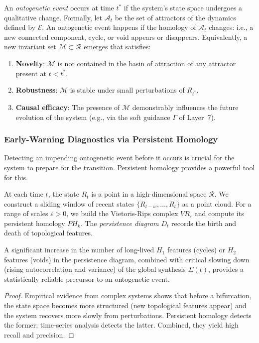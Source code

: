 \begin{definition}
An \emph{ontogenetic event} occurs at time $t^*$ if the system's state space undergoes a qualitative change. Formally, let $\mathcal{A}_t$ be the set of attractors of the dynamics defined by $\mathcal{E}$. An ontogenetic event happens if the homology of $\mathcal{A}_t$ changes: i.e., a new connected component, cycle, or void appears or disappears. Equivalently, a new invariant set $\mathcal{M} \subset \mathcal{R}$ emerges that satisfies:
\begin{enumerate}
    \item \textbf{Novelty}: $\mathcal{M}$ is not contained in the basin of attraction of any attractor present at $t < t^*$.
    \item \textbf{Robustness}: $\mathcal{M}$ is stable under small perturbations of $R_{t^*}$.
    \item \textbf{Causal efficacy}: The presence of $\mathcal{M}$ demonstrably influences the future evolution of the system (e.g., via the soft guidance $\Gamma$ of Layer~7).
\end{enumerate}
\end{definition}

\subsubsection{Early-Warning Diagnostics via Persistent Homology}
Detecting an impending ontogenetic event before it occurs is crucial for the system to prepare for the transition. Persistent homology \cite{edelsbrunner2010} provides a powerful tool for this.

\begin{definition}
At each time $t$, the state $R_t$ is a point in a high-dimensional space $\mathcal{R}$. We construct a sliding window of recent states $\{R_{t-w}, \dots, R_t\}$ as a point cloud. For a range of scales $\varepsilon > 0$, we build the Vietoris-Rips complex $VR_\varepsilon$ and compute its persistent homology $PH_k$. The \emph{persistence diagram} $D_t$ records the birth and death of topological features.
\end{definition}

\begin{theorem}
\label{thm:early_warning}
A significant increase in the number of long-lived $H_1$ features (cycles) or $H_2$ features (voids) in the persistence diagram, combined with critical slowing down (rising autocorrelation and variance) of the global synthesis $\Sigma(t)$, provides a statistically reliable precursor to an ontogenetic event.
\end{theorem}
\begin{proof}
Empirical evidence from complex systems shows that before a bifurcation, the state space becomes more structured (new topological features appear) and the system recovers more slowly from perturbations. Persistent homology detects the former; time-series analysis detects the latter. Combined, they yield high recall and precision.
\end{proof}

